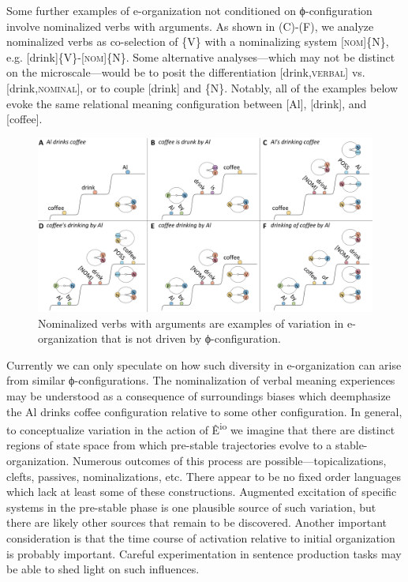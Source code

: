   Some further examples of e-organization not conditioned on ϕ-configuration involve nominalized verbs with arguments. As shown in {}(C)-(F), we analyze nominalized verbs as co-selection of \{V\} with a nominalizing system [\textsc{nom}]\{N\}, e.g. [drink]\{V\}-[\textsc{nom}]\{\textsc{N}\}. Some alternative analyses—which may not be distinct on the microscale—would be to posit the differentiation [drink,\textsc{verbal}] vs. [drink,\textsc{nominal}], or to couple [drink] and \{N\}. Notably, all of the examples below evoke the same relational meaning configuration between [Al], [drink], and [coffee].

  
\begin{figure}
\includegraphics[width=\textwidth]{figures/Tilsen-img82.png}
\caption{Nominalized verbs with arguments are examples of variation in e-organization that is not driven by ϕ-configuration.}
\label{fig:4:32}
\end{figure}
 

  Currently we can only speculate on how such diversity in e-organization can arise from similar ϕ-configurations. The nominalization of verbal meaning experiences may be understood as a consequence of surroundings biases which deemphasize the {\textbar}Al drinks coffee{\textbar} configuration relative to some other configuration. In general, to conceptualize variation in the action of Ê\textsuperscript{io} we imagine that there are distinct regions of state space from which pre-stable trajectories evolve to a stable-organization. Numerous outcomes of this process are possible—topicalizations, clefts, passives, nominalizations, etc. There appear to be no fixed order languages which lack at least some of these constructions. Augmented excitation of specific systems in the pre-stable phase is one plausible source of such variation, but there are likely other sources that remain to be discovered. Another important consideration is that the time course of activation relative to initial organization is probably important. Careful experimentation in sentence production tasks may be able to shed light on such influences.

